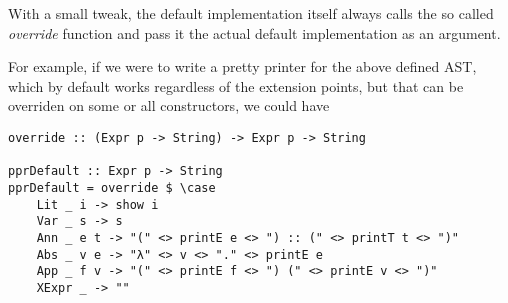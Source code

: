 \documentclass{article}
\begin{document}
With a small tweak, the default implementation itself always calls the
so called \emph{override} function and pass it the actual default implementation as
an argument.

For example, if we were to write a pretty printer for the above defined AST,
which by default works regardless of the extension points, but that can be
overriden on some or all constructors, we could have

\begin{lstlisting}
override :: (Expr p -> String) -> Expr p -> String

pprDefault :: Expr p -> String
pprDefault = override $ \case 
    Lit _ i -> show i
    Var _ s -> s
    Ann _ e t -> "(" <> printE e <> ") :: (" <> printT t <> ")"
    Abs _ v e -> "λ" <> v <> "." <> printE e
    App _ f v -> "(" <> printE f <> ") (" <> printE v <> ")"
    XExpr _ -> ""
\end{lstlisting}
\end{document}
